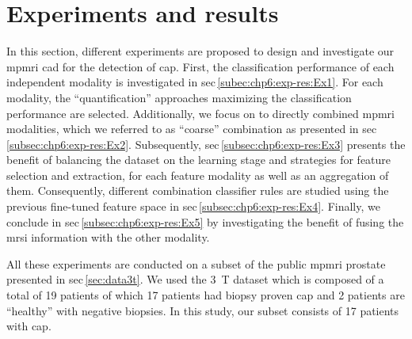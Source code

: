 \section{Experiments and results}\label{sec:chp6:exp-res}

In this section, different experiments are proposed to design and investigate our \ac{mpmri} \ac{cad} for the detection of \ac{cap}.
First, the classification performance of each independent modality is investigated in \acs{sec}\,\ref{subec:chp6:exp-res:Ex1}.
For each modality, the ``quantification'' approaches maximizing the classification performance are selected.
Additionally, we focus on to directly combined \ac{mpmri} modalities, which we referred to as ``coarse'' combination as presented in \acs*{sec}\,\ref{subsec:chp6:exp-res:Ex2}.
Subsequently, \acs{sec}\,\ref{subsec:chp6:exp-res:Ex3} presents the benefit of balancing the dataset on the learning stage and strategies for feature selection and extraction, for each feature modality as well as an aggregation of them.
Consequently, different combination classifier rules are studied using the previous fine-tuned feature space in \acs{sec}\,\ref{subsec:chp6:exp-res:Ex4}.
Finally, we conclude in \acs{sec}\,\ref{subsec:chp6:exp-res:Ex5} by investigating the benefit of fusing the \ac{mrsi} information with the other modality.

All these experiments are conducted on a subset of the public \ac{mpmri} prostate presented in \acs{sec}\,\ref{sec:data3t}.
We used the \SI{3}{\tesla} dataset which is composed of a total of 19 patients of which 17 patients had biopsy proven \ac{cap} and 2 patients are ``healthy'' with negative biopsies. 
In this study, our subset consists of 17 patients with \ac{cap}.


